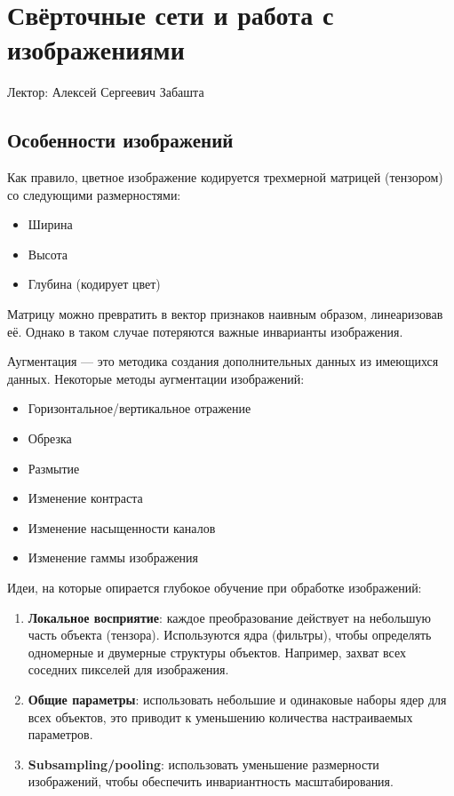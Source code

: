 \chapter{Свёрточные сети и работа с изображениями}

Лектор: Алексей Сергеевич Забашта

\section{Особенности изображений}

Как правило, цветное изображение кодируется трехмерной матрицей (тензором) со следующими размерностями:
\begin{itemize}
    \item Ширина
    \item Высота
    \item Глубина (кодирует цвет)
\end{itemize}

Матрицу можно превратить в вектор признаков наивным образом, линеаризовав её. Однако в таком случае потеряются важные инварианты изображения.

\begin{definition}
    Аугментация --- это методика создания дополнительных данных из имеющихся данных. Некоторые методы аугментации изображений:
    \begin{itemize}
        \item Горизонтальное/вертикальное отражение
        \item Обрезка
        \item Размытие
        \item Изменение контраста
        \item Изменение насыщенности каналов
        \item Изменение гаммы изображения
    \end{itemize}
\end{definition}

Идеи, на которые опирается глубокое обучение при обработке изображений:
\begin{enumerate}
    \item \textbf{Локальное восприятие}: каждое преобразование действует на небольшую часть объекта (тензора). Используются ядра (фильтры), чтобы определять одномерные и двумерные структуры объектов. Например, захват всех соседних пикселей для изображения.
    \item \textbf{Общие параметры}: использовать небольшие и одинаковые наборы ядер для всех объектов, это приводит к уменьшению количества настраиваемых параметров.
    \item \textbf{Subsampling/pooling}: использовать уменьшение размерности изображений, чтобы обеспечить инвариантность масштабирования.
\end{enumerate}

